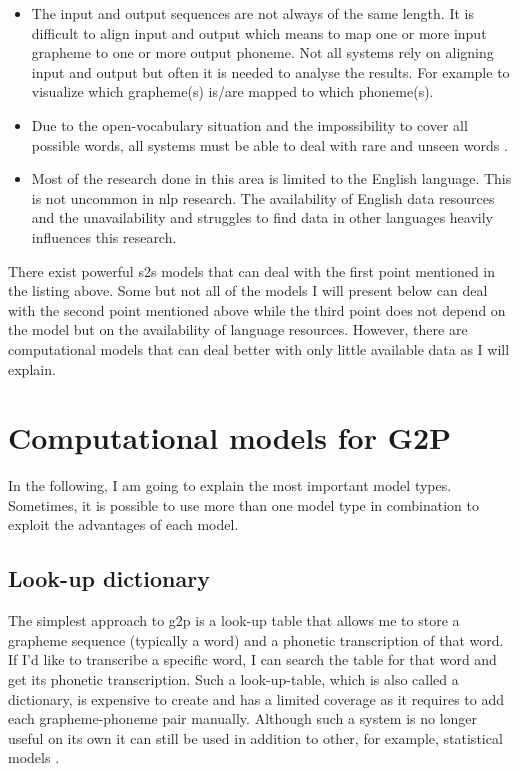 \begin{itemize}
\item The input and output sequences are not always of the same length. It is difficult to align input and output which means to map one or more input grapheme to one or more output phoneme. Not all systems rely on aligning input and output but often it is needed to analyse the results. For example to visualize which grapheme(s) is/are mapped to which phoneme(s). 
\item Due to the open-vocabulary situation and the impossibility to cover all possible words, all systems must be able to deal with rare and unseen words \citep{Rao2015GraphemetophonemeCU, ney-joint-sequence2008}. 
\item Most of the research done in this area is limited to the English language. This is not uncommon in \ac{nlp} research. The availability of English data resources and the unavailability and struggles to find data in other languages heavily influences this research.
\end{itemize}

There exist powerful \ac{s2s} models that can deal with the first point mentioned in the listing above. Some but not all of the models I will present below can deal with the second point mentioned above while the third point does not depend on the model but on the availability of language resources. However, there are computational models that can deal better with only little available data as I will explain. 

\section{Computational models for G2P}
In the following, I am going to explain the most important model types. Sometimes, it is possible to use more than one model type in combination to exploit the advantages of each model.

\subsection{Look-up dictionary} The simplest approach to \ac{g2p} is a look-up table that allows me to store a grapheme sequence (typically a word) and a phonetic transcription of that word. If I'd like to transcribe a specific word, I can search the table for that word and get its phonetic transcription. Such a look-up-table, which is also called a dictionary, is expensive to create and has a limited coverage as it requires to add each grapheme-phoneme pair manually. Although such a system is no longer useful on its own it can still be used in addition to other, for example, statistical models \citep{ney-joint-sequence2008}.


